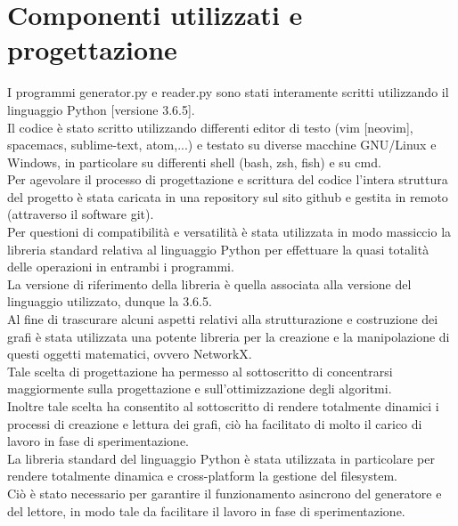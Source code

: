 \section{Componenti utilizzati e progettazione}
\justify
I programmi generator.py e reader.py sono stati interamente scritti utilizzando il linguaggio Python [versione 3.6.5].\\

Il codice è stato scritto utilizzando differenti editor di testo (vim [neovim], spacemacs, sublime-text, atom,...) e testato su diverse macchine GNU/Linux e Windows, in particolare su differenti shell (bash, zsh, fish) e su cmd.\\

Per agevolare il processo di progettazione e scrittura del codice l'intera struttura del progetto è stata caricata in una repository sul sito github e gestita in remoto (attraverso il software git).\\

Per questioni di compatibilità e versatilità è stata utilizzata in modo massiccio la libreria standard relativa al linguaggio Python per effettuare la quasi totalità delle operazioni in entrambi i programmi.\\

La versione di riferimento della libreria è quella associata alla versione del linguaggio utilizzato, dunque la 3.6.5.\\

Al fine di trascurare alcuni aspetti relativi alla strutturazione e costruzione dei grafi è stata utilizzata una potente libreria per la creazione e la manipolazione di questi oggetti matematici, ovvero NetworkX.\\

Tale scelta di progettazione ha permesso al sottoscritto di concentrarsi maggiormente sulla progettazione e sull'ottimizzazione degli algoritmi.\\

Inoltre tale scelta ha consentito al sottoscritto di rendere totalmente dinamici i processi di creazione e lettura dei grafi, ciò ha facilitato di molto il carico di lavoro in fase di sperimentazione.\\

La libreria standard del linguaggio Python è stata utilizzata in particolare per rendere totalmente dinamica e cross-platform la gestione del filesystem.\\

Ciò è stato necessario per garantire il funzionamento asincrono del generatore e del lettore, in modo tale da facilitare il lavoro in fase di sperimentazione.\\

